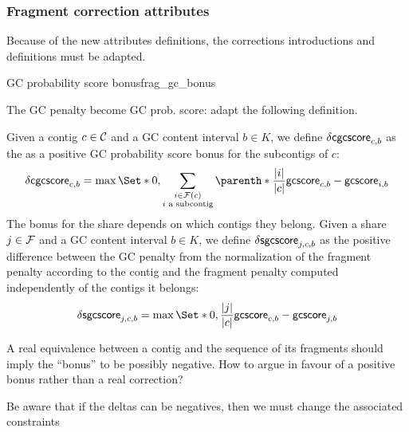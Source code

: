 \subsubsection{Fragment correction attributes}

\begin{fixmebox}
    Because of the new attributes definitions, the corrections introductions and definitions must be adapted.
\end{fixmebox}

\begin{definition}{GC probability score bonus}{frag_gc_bonus}
    \begin{fixmebox}
        The GC penalty become GC prob. score: adapt the following definition.
    \end{fixmebox}
    Given a contig \(c \in \mathcal{C}{}\) and a GC content interval \(b \in K\), we define \(\mathsf{\delta cgcscore}_{c, b}\) as the as a positive GC probability score bonus for the subcontigs of \(c\):
    \[
        \dcgcscore{c}{b} = \max \Set*{
            0, 
            \sum_{\substack{
                i \in \Fragments{}(c) \\ i \text{ a subcontig}
            }} 
            \parenth*{
                \frac{|i|}{|c|}\gcscore{c}{b} - \gcscore{i}{b}
            }
        } 
    \]
    The bonus for the share depends on which contigs they belong.
    Given a share \(j \in \mathcal{F}{}\) and a GC content interval \(b \in K\), we define \(\mathsf{\delta sgcscore}_{j, c, b}\) as the positive difference between the GC penalty from the normalization of the fragment penalty according to the contig and the fragment penalty computed independently of the contigs it belongs:
    \[
        \dsgcscore{j}{c}{b} = \max \Set*{
            0,
            \frac{|j|}{|c|} \gcscore{c}{b} - \gcscore{j}{b}
        }
    \]
    \begin{questionbox}
        A real equivalence between a contig and the sequence of its fragments should imply the \enquote{bonus} to be possibly negative.
        How to argue in favour of a positive bonus rather than a real correction?

        Be aware that if the deltas can be negatives, then we must change the associated constraints
    \end{questionbox}
\end{definition}

